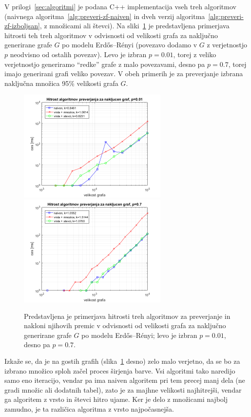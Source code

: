 \documentclass[12pt,a4paper,twoside]{article}
\theoremstyle{definition} %
\theoremstyle{plain} %
\numberwithin{equation}{section}  %
\begin{document}
V prilogi~\ref{sec:algoritmi} je podana C++ implementacija vseh treh algoritmov (naivnega algoritma~\ref{alg:preveri-zf-naiven} in dveh verzij algoritma~\ref{alg:preveri-zf-izboljsan}, z množicami ali števci). Na sliki~\ref{fig:primerjava-check-random-graf} je predstavljena primerjava hitrosti teh treh algoritmov v odvisnosti od velikosti grafa za naključno generirane grafe $G$ po modelu Erdős–Rényi (povezavo dodamo v $G$ z verjetnostjo $p$ neodvisno od ostalih povezav). Levo je izbran $p=0.01$, torej z veliko verjetnostjo generiramo ``redke'' grafe z malo povezavami, desno pa $p=0.7$, torej imajo generirani grafi veliko povezav.
V obeh primerih je za preverjanje izbrana naključna množica 95\% velikosti grafa $G$.
\begin{figure}[h]
    \centering
    \includegraphics[width=210pt]{koda/results/plots/random_sparse.png}
    \includegraphics[width=210pt]{koda/results/plots/random_dense.png}
    \caption{Predstavljena je primerjava hitrosti treh algoritmov za preverjanje in nakloni njihovih premic v odvisnosti od velikosti grafa za naključno generirane grafe $G$ po modelu Erdős–Rényi; levo je izbran $p=0.01$, desno pa $p=0.7$.}
    \label{fig:primerjava-check-random-graf}
\end{figure}

Izkaže se, da je na gostih grafih (slika~\ref{fig:primerjava-check-random-graf} desno) zelo malo verjetno, da se bo za izbrano množico sploh začel proces širjenja barve. Vsi algoritmi tako naredijo samo eno iteracijo, vendar pa ima naiven algoritem pri tem precej manj dela (ne gradi množic ali dodatnih tabel), zato je za majhne velikosti najhitrejši, vendar ga algoritem z vrsto in števci hitro ujame. Ker je delo z množicami najbolj zamudno, je ta različica algoritma z vrsto najpočasnejša.
\end{document}

